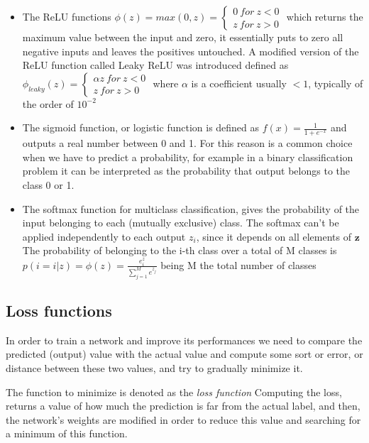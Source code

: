 \documentclass[a4paper,11pt]{article}
\begin{document}
\begin{itemize}

\item The ReLU functions $\phi(z) = max(0, z) = \begin{cases} 0 \ for \ z<0 \\ z \ for \ z>0 \end{cases}$ which returns the maximum value between the input and zero, it essentially puts to zero all negative inputs and leaves the positives untouched.
A modified version of the ReLU function called Leaky ReLU was introduced defined as
$\phi_{leaky}(z) = \begin{cases} \alpha z \ for \ z<0 \\ z \ for \ z>0 \end{cases}$ where $\alpha$ is a coefficient usually $< 1$, typically of the order of $10^{-2}$


\item The sigmoid function, or logistic function is defined as $f(x) = \frac{1}{1+e^{-x}}$ and outputs a real number between 0 and 1. For this reason is a common choice when we have to predict a probability, for example in a binary classification problem it can be interpreted as the probability that output belongs to the class 0 or 1.


\item The softmax function for multiclass classification, gives the probability of the input belonging to each (mutually exclusive) class. The softmax can't be applied independently to each output $z_i$, since it depends on all elements of $\textbf{z}$ The probability of belonging to the i-th class over a total of M classes is
$p(i = i|z) = \phi(z) = \frac{e^z_i}{\sum_{j = 1}^M e^{z_j}}$ being M the total number of classes
\end{itemize}


\subsection{Loss functions}\label{sec:loss_functions}

In order to train a network and improve its performances we need to compare the predicted (output) value with the actual value and compute some sort or error, or distance between these two values, and try to gradually minimize it.


The function to minimize is denoted as the \emph{loss function}
Computing the loss, returns a value of how much the prediction is far from the actual label, and then, the network's weights are modified in order to reduce this value and searching for a minimum of this function.
\end{document}

